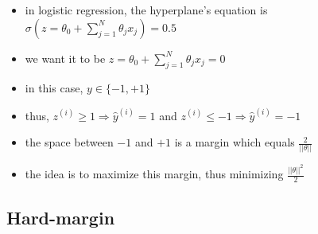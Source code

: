 \documentclass[xcolor=table]{beamer}
\begin{document}
\begin{frame}
	\frametitle{\insertshortsubtitle}
	\framesubtitle{\insertsection}
	
	\begin{minipage}{0.75\textwidth} 
		\begin{itemize}
			\item in logistic regression, the hyperplane's equation is $ \sigma(z = \theta_0 + \sum_{j=1}^{N} \theta_j x_j) = 0.5 $
			\item we want it to be $ z = \theta_0 + \sum_{j=1}^{N} \theta_j x_j = 0 $
			\item in this case, $ y \in \{-1, +1\} $
			\item thus, $ z^{(i)} \ge 1 \Rightarrow \hat{y}^{(i)} = 1 $ and $ z^{(i)} \le -1 \Rightarrow \hat{y}^{(i)} = -1 $
		\end{itemize}
	\end{minipage}
	\begin{minipage}{0.24\textwidth} 
	\end{minipage}
	
	\begin{itemize}
		\item the space between $ -1 $ and $ +1 $ is a margin which equals $ \frac{2}{||\theta||} $
		\item the idea is to maximize this margin, thus minimizing $ \frac{||\theta||^2}{2} $
	\end{itemize}
	
\end{frame}

\subsection{Hard-margin}
\end{document}

